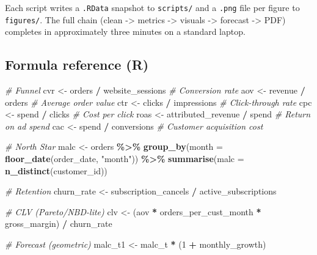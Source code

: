 \documentclass[
  11pt,
]{article}
\newenvironment{Shaded}{\begin{snugshade}}{\end{snugshade}}
\newcommand{\AttributeTok}[1]{\textcolor[rgb]{0.13,0.29,0.53}{#1}}
\newcommand{\CommentTok}[1]{\textcolor[rgb]{0.56,0.35,0.01}{\textit{#1}}}
\newcommand{\DecValTok}[1]{\textcolor[rgb]{0.00,0.00,0.81}{#1}}
\newcommand{\FunctionTok}[1]{\textcolor[rgb]{0.13,0.29,0.53}{\textbf{#1}}}
\newcommand{\NormalTok}[1]{#1}
\newcommand{\OtherTok}[1]{\textcolor[rgb]{0.56,0.35,0.01}{#1}}
\newcommand{\SpecialCharTok}[1]{\textcolor[rgb]{0.81,0.36,0.00}{\textbf{#1}}}
\newcommand{\StringTok}[1]{\textcolor[rgb]{0.31,0.60,0.02}{#1}}
\begin{document}
Each script writes a \texttt{.RData} snapshot to \texttt{scripts/} and a
\texttt{.png} file per figure to \texttt{figures/}. The full chain
(clean -\textgreater{} metrics -\textgreater{} visuals -\textgreater{}
forecast -\textgreater{} PDF) completes in approximately three minutes
on a standard laptop.

\subsection{Formula reference (R)}\label{formula-reference-r}

\begin{Shaded}
\begin{Highlighting}[]
\CommentTok{\# Funnel}
\NormalTok{cvr  }\OtherTok{\textless{}{-}}\NormalTok{ orders }\SpecialCharTok{/}\NormalTok{ website\_sessions          }\CommentTok{\# Conversion rate}
\NormalTok{aov  }\OtherTok{\textless{}{-}}\NormalTok{ revenue }\SpecialCharTok{/}\NormalTok{ orders                   }\CommentTok{\# Average order value}
\NormalTok{ctr  }\OtherTok{\textless{}{-}}\NormalTok{ clicks }\SpecialCharTok{/}\NormalTok{ impressions               }\CommentTok{\# Click{-}through rate}
\NormalTok{cpc  }\OtherTok{\textless{}{-}}\NormalTok{ spend }\SpecialCharTok{/}\NormalTok{ clicks                     }\CommentTok{\# Cost per click}
\NormalTok{roas }\OtherTok{\textless{}{-}}\NormalTok{ attributed\_revenue }\SpecialCharTok{/}\NormalTok{ spend         }\CommentTok{\# Return on ad spend}
\NormalTok{cac  }\OtherTok{\textless{}{-}}\NormalTok{ spend }\SpecialCharTok{/}\NormalTok{ conversions                }\CommentTok{\# Customer acquisition cost}

\CommentTok{\# North Star}
\NormalTok{malc }\OtherTok{\textless{}{-}}\NormalTok{ orders }\SpecialCharTok{\%\textgreater{}\%}
  \FunctionTok{group\_by}\NormalTok{(}\AttributeTok{month =} \FunctionTok{floor\_date}\NormalTok{(order\_date, }\StringTok{"month"}\NormalTok{)) }\SpecialCharTok{\%\textgreater{}\%}
  \FunctionTok{summarise}\NormalTok{(}\AttributeTok{malc =} \FunctionTok{n\_distinct}\NormalTok{(customer\_id))}

\CommentTok{\# Retention}
\NormalTok{churn\_rate }\OtherTok{\textless{}{-}}\NormalTok{ subscription\_cancels }\SpecialCharTok{/}\NormalTok{ active\_subscriptions}

\CommentTok{\# CLV (Pareto/NBD{-}lite)}
\NormalTok{clv }\OtherTok{\textless{}{-}}\NormalTok{ (aov }\SpecialCharTok{*}\NormalTok{ orders\_per\_cust\_month }\SpecialCharTok{*}\NormalTok{ gross\_margin) }\SpecialCharTok{/}\NormalTok{ churn\_rate}

\CommentTok{\# Forecast (geometric)}
\NormalTok{malc\_t1 }\OtherTok{\textless{}{-}}\NormalTok{ malc\_t }\SpecialCharTok{*}\NormalTok{ (}\DecValTok{1} \SpecialCharTok{+}\NormalTok{ monthly\_growth)}
\end{Highlighting}
\end{Shaded}
\end{document}
